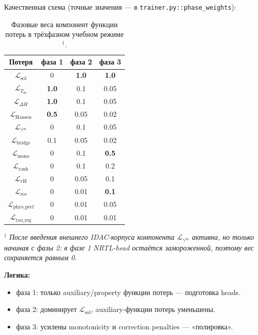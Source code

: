 \documentclass[11pt]{article}
\begin{document}
Качественная схема (точные значения --- в \texttt{trainer.py::phase\_weights}):

\begin{table}[H]
\centering
\begin{tabular}{|c|c|c|c|}
\hline
Потеря & фаза 1 & фаза 2 & фаза 3 \\
\hline
$\mathcal{L}_{\mathrm{sol}}$ & 0 & \textbf{1.0} & \textbf{1.0} \\
\hline
$\mathcal{L}_{T_{\mathrm{m}}}$ & \textbf{1.0} & 0.1 & 0.05 \\
\hline
$\mathcal{L}_{\Delta H}$ & \textbf{1.0} & 0.1 & 0.05 \\
\hline
$\mathcal{L}_{\mathrm{Hansen}}$ & \textbf{0.5} & 0.05 & 0.02 \\
\hline
$\mathcal{L}_{\gamma^\infty}$ & 0 & 0.1 & 0.05 \\
\hline
$\mathcal{L}_{\mathrm{bridge}}$ & 0.1 & 0.05 & 0.02 \\
\hline
$\mathcal{L}_{\mathrm{mono}}$ & 0 & 0.1 & \textbf{0.5} \\
\hline
$\mathcal{L}_{\mathrm{rank}}$ & 0 & 0.1 & 0.2 \\
\hline
$\mathcal{L}_{\mathrm{vH}}$ & 0 & 0.05 & 0.1 \\
\hline
$\mathcal{L}_{\mathrm{res}}$ & 0 & 0.01 & \textbf{0.1} \\
\hline
$\mathcal{L}_{\mathrm{phys\_pref}}$ & 0 & 0.01 & 0.05 \\
\hline
$\mathcal{L}_{\mathrm{tau\_reg}}$ & 0 & 0.01 & 0.01 \\
\hline
\end{tabular}
\caption{Фазовые веса компонент функции потерь в трёхфазном учебном режиме$^{\dagger}$.}
\label{tab:phase-loss-weights}
\end{table}

\textit{$^{\dagger}$ После введения внешнего IDAC-корпуса компонента $\mathcal{L}_{\gamma^\infty}$ активна, но только начиная с фазы 2: в фазе 1 NRTL-head остаётся замороженной, поэтому вес сохраняется равным 0.}

\textbf{Логика:}

\begin{itemize}
  \item фаза 1: только auxiliary/property функции потерь --- подготовка heads.
  \item фаза 2: доминирует $\mathcal{L}_{\mathrm{sol}}$, auxiliary-функции потерь уменьшены.
  \item фаза 3: усилены monotonicity и correction penalties --- «полировка».
\end{itemize}
\end{document}
